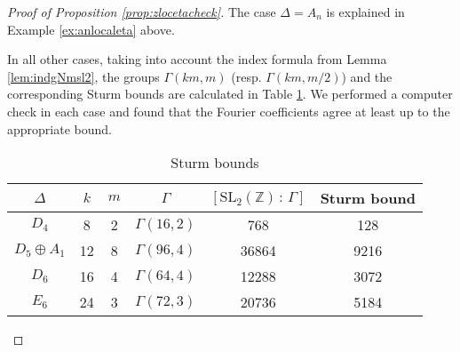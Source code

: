 \documentclass{article}
\theoremstyle{definition}
\newcommand{\ZZ} {{\mathbb Z}}		%
\begin{document}
\begin{proof}[{Proof of Proposition \ref{prop:zlocetacheck}}]
	The case $\Delta=A_n$ is explained in Example \ref{ex:anlocaleta} above. 
	
	
	
	In all other cases, taking into account the index formula from Lemma \ref{lem:indgNmsl2}, the groups $\Gamma(km,m)$ (resp. $\Gamma(km,m/2)$) and the corresponding Sturm bounds are calculated in Table \ref{table:sturm}. We performed a computer check in each case and found that the Fourier coefficients agree at least up to the appropriate bound.
	
	\begin{table}
	\begin{center}
		\begin{tabular}{ |c|c|c|c|c|c| }
			\hline
			$\Delta$ & $k$ & $m$ & $\Gamma$ & $[\mathrm{SL}_2(\ZZ) \, : \, \Gamma]$ & Sturm bound \\
			\hline
			$D_4$ & 8 & 2 & $\Gamma(16,2)$ & 768 & 128 \\
			$D_5\oplus A_1$ & 12 & 8 & $\Gamma(96,4)$ & 36864 & 9216 \\
			$D_6$ & 16 & 4 & $\Gamma(64,4)$ & 12288 & 3072 \\
			$E_6$ & 24 & 3 & $\Gamma(72,3)$ & 20736 & 5184 \\
			\hline
		\end{tabular}
		\vspace{0.2in}
		\caption{Sturm bounds}
\end{center}
		\label{table:sturm}
	\end{table}
\end{proof}




\end{document}
